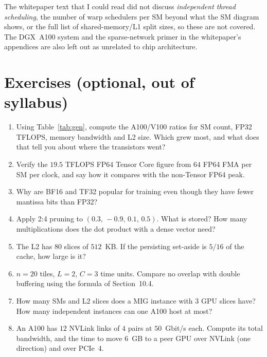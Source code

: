 The whitepaper text that I could read did not discuss \emph{independent thread scheduling}, the number of warp schedulers per SM beyond what the SM diagram shows, or the full list of shared-memory/L1 split sizes, so these are not covered. The DGX~A100 system
and the sparse-network primer in the whitepaper's appendices are also left out as unrelated to chip architecture.

\section*{Exercises (optional, out of syllabus)}
\begin{enumerate}[label=\textbf{\thechapter.\arabic*},leftmargin=*]
  \item Using Table~\ref{tab:gen}, compute the A100/V100 ratios for SM count, FP32 TFLOPS, memory bandwidth and L2 size. Which grew most, and what does that tell you about where the transistors went?
  \item Verify the $19.5$ TFLOPS FP64 Tensor Core figure from $64$ FP64 FMA per SM per clock, and say how it compares with the non-Tensor FP64 peak.
  \item Why are BF16 and TF32 popular for training even though they have fewer mantissa bits than FP32?
  \item Apply 2:4 pruning to $(0.3,\,-0.9,\,0.1,\,0.5)$. What is stored? How many multiplications does the dot product with a dense vector need?
  \item The L2 has $80$ slices of $512$~KB. If the persisting set-aside is $5/16$ of the cache, how large is it?
  \item $n=20$ tiles, $L=2$, $C=3$ time units. Compare no overlap with double buffering using the formula of Section~10.4.
  \item How many SMs and L2 slices does a MIG instance with $3$ GPU slices have? How many independent instances can one A100 host at most?
  \item An A100 has $12$ NVLink links of $4$ pairs at $50$~Gbit/s each. Compute its total bandwidth, and the time to move $6$~GB to a peer GPU over NVLink (one direction) and over PCIe~4.
\end{enumerate}

